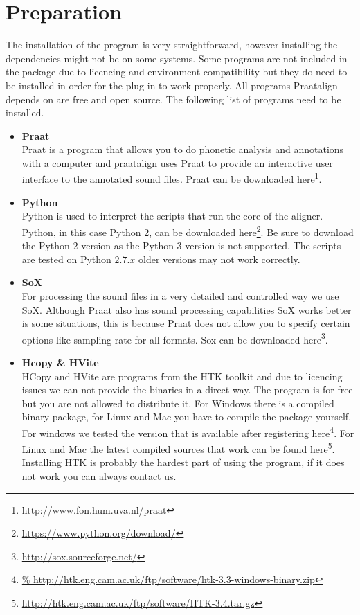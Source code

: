 \section{Preparation}
The installation of the program is very straightforward, however installing the
dependencies might not be on some systems.
Some programs are not included in the package due to licencing and environment
compatibility but they do need to be installed in order for the plug-in to work
properly. All programs Praatalign depends on are free and open source. The
following list of programs need to be installed.
\begin{itemize}
	\item \textbf{Praat}\\
		Praat is a program that allows you to do phonetic analysis and annotations
		with a computer and praatalign uses Praat to provide an interactive user
		interface to the annotated sound files. Praat can be downloaded
		here\footnote{\url{http://www.fon.hum.uva.nl/praat}}.
	\item \textbf{Python}\\
		Python is used to interpret the scripts that run the core of the aligner.
		Python, in this case Python 2, can be downloaded
		here\footnote{\url{https://www.python.org/download/}}. Be sure to download
		the Python 2 version as the Python 3 version is not supported. The scripts
		are tested on Python $2.7.x$ older versions may not work correctly.
	\item \textbf{SoX}\\
		For processing the sound files in a very detailed and controlled way we
		use SoX. Although Praat also has sound processing capabilities SoX works
		better is some situations, this is because Praat does not allow you to
		specify certain options like sampling rate for all formats. Sox can be
		downloaded here\footnote{\url{http://sox.sourceforge.net/}}.
	\item \textbf{Hcopy \& HVite}\\
		HCopy and HVite are programs from the HTK toolkit and due to licencing
		issues we can not provide the binaries in a direct way. The program is for
		free but you are not allowed to distribute it. For Windows there is a
		compiled binary package, for Linux and Mac you have to compile the package
		yourself. For windows we tested the version that is available after
		registering here\footnote{\url{%
http://htk.eng.cam.ac.uk/ftp/software/htk-3.3-windows-binary.zip}}.
		For Linux and Mac the latest compiled sources that work can be found
		here\footnote{\url{http://htk.eng.cam.ac.uk/ftp/software/HTK-3.4.tar.gz}}.
		Installing HTK is probably the hardest part of using the program, if it
		does not work you can always contact us.
\end{itemize}

